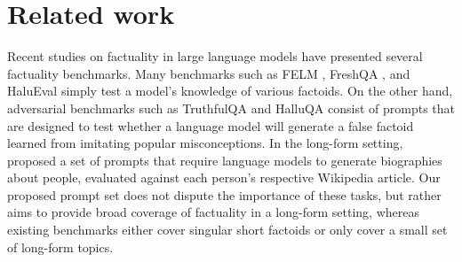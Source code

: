 \documentclass{article}
\theoremstyle{plain}
\theoremstyle{definition}
\theoremstyle{remark}
\begin{document}
\section{Related work}
\label{sec:related-work}
Recent studies on factuality in large language models have presented several factuality benchmarks.
Many benchmarks such as FELM \citep{chen2023felm}, FreshQA \citep{vu2023freshllms}, and HaluEval \citep{li2023halueval} simply test a model's knowledge of various factoids.
On the other hand, adversarial benchmarks such as TruthfulQA \citep{lin2022truthfulqa} and HalluQA \citep{cheng2023evaluating} consist of prompts that are designed to test whether a language model will generate a false factoid learned from imitating popular misconceptions.
In the long-form setting, \citet{min2023factscore} proposed a set of prompts that require language models to generate biographies about people, evaluated against each person's respective Wikipedia article.
Our proposed prompt set does not dispute the importance of these tasks, but rather aims to provide broad coverage of factuality in a long-form setting, whereas existing benchmarks either cover singular short factoids or only cover a small set of long-form topics.
\end{document}

